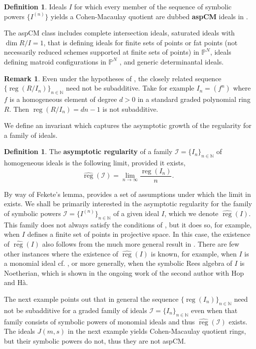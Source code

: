 \documentclass[12pt, reqno]{amsart}
\numberwithin{equation}{section}
\newcommand{\N}{{\mathbb N}}
\renewcommand{\P}{{\mathbb P}}
\newcommand{\cI}{{\mathcal I}}
\DeclareMathOperator{\reg}{reg}
\theoremstyle{plain} %
\theoremstyle{definition}
\newtheorem{defn}[thm]{Definition}
\newtheorem{rem}[thm]{Remark}
\theoremstyle{remark}
\begin{document}
\begin{defn}
\label{def:aspCM}
Ideals $I$ for which every member of the sequence of symbolic powers  $\{I^{(n)}\}$ yields a Cohen-Macaulay quotient are dubbed {\bf aspCM} ideals in \cite{walker}. 
\end{defn}
The aspCM class includes complete intersection ideals, saturated ideals with $\dim R/I=1$, that is defining ideals for finite sets of points or fat points (not necessarily reduced schemes supported at finite sets of points) in $\P^N$, ideals defining matroid configurations in $\P^N$ \cite{GHMN}, and generic determinantal ideals.

\begin{rem}
Even under the hypotheses of , the closely related sequence $\{\reg(R/I_n)\}_{n\in\N}$ need not be subadditive. Take for example $I_n=(f^n)$ where $f$ is a homogeneous element of degree $d>0$ in a standard graded polynomial ring $R$. Then $\reg(R/I_n)=dn-1$ is not subadditive.
\end{rem}


We define an  invariant which captures the asymptotic growth of the regularity for a family of ideals.
  
 \begin{defn}
 \label{def:areg}
 The {\bf asymptotic regularity} of a family $\cI=\{I_n\}_{n\in \N}$ of homogeneous ideals  is the following limit, provided it exists,
 \[
 \widehat{\reg}(\cI)=\lim_{n\to \infty}\frac{\reg(I_n)}{n}.
 \]
 \end{defn}
 
By way of Fekete's lemma,  provides a set of assumptions under which the limit in  exists. We shall be primarily interested in the asymptotic regularity for the family of symbolic powers $\cI=\{I^{(n)}\}_{n\in \N}$ of a given ideal $I$, which we denote $ \widehat{\reg}(I)$. This family does not always satisfy the conditions of  , but it does so, for example, when $I$ defines a finite set of points in projective space. In this case, the existence of  $ \widehat{\reg}(I)$ also follows from the much more general result in \cite[Theorem B]{CEL01}. There are few other instances where the existence of $\widehat{\reg}(I)$ is known, for example, when $I$ is a monomial ideal cf. \cite[Theorem 3.6.]{DHNT21}, or more generally, when the symbolic Rees algebra of $I$ is Noetherian, which is shown in the ongoing work of the second author with Hop and H\`a. 

The next example points out that in general the sequence $\{\reg(I_n)\}_{n\in\N}$ need not be subadditive for a graded family of ideals $\mathcal{I}=\{I_n\}_{n\in\N}$ even when that family consists of symbolic powers of monomial ideals and thus $\widehat{\reg}(\cI)$ exists. The ideals $J(m,s)$ in the next example yields Cohen-Macaulay quotient rings, but their symbolic powers do not, thus they are not aspCM.
 
\end{document}
